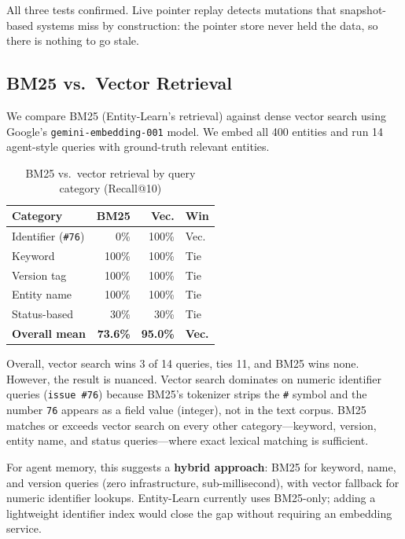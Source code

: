 \documentclass[11pt,twocolumn]{article}
\begin{document}
All three tests confirmed. Live pointer replay detects mutations that snapshot-based systems miss by construction: the pointer store never held the data, so there is nothing to go stale.

\subsection{BM25 vs.\ Vector Retrieval}

We compare BM25 (Entity-Learn's retrieval) against dense vector search using Google's \texttt{gemini-embedding-001} model. We embed all 400 entities and run 14 agent-style queries with ground-truth relevant entities.

\begin{table}[t]
\centering\small
\caption{BM25 vs.\ vector retrieval by query category (Recall@10)}
\label{tab:bm25-vs-vector}
\begin{tabular}{@{}lrrl@{}}
\toprule
\textbf{Category} & \textbf{BM25} & \textbf{Vec.} & \textbf{Win} \\
\midrule
Identifier (\texttt{\#76}) & 0\% & 100\% & Vec. \\
Keyword & 100\% & 100\% & Tie \\
Version tag & 100\% & 100\% & Tie \\
Entity name & 100\% & 100\% & Tie \\
Status-based & 30\% & 30\% & Tie \\
\midrule
\textbf{Overall mean} & \textbf{73.6\%} & \textbf{95.0\%} & \textbf{Vec.} \\
\bottomrule
\end{tabular}
\end{table}

Overall, vector search wins 3 of 14 queries, ties 11, and BM25 wins none. However, the result is nuanced. Vector search dominates on numeric identifier queries (\texttt{issue \#76}) because BM25's tokenizer strips the \texttt{\#} symbol and the number \texttt{76} appears as a field value (integer), not in the text corpus. BM25 matches or exceeds vector search on every other category---keyword, version, entity name, and status queries---where exact lexical matching is sufficient.

For agent memory, this suggests a \textbf{hybrid approach}: BM25 for keyword, name, and version queries (zero infrastructure, sub-millisecond), with vector fallback for numeric identifier lookups. Entity-Learn currently uses BM25-only; adding a lightweight identifier index would close the gap without requiring an embedding service.
\end{document}
